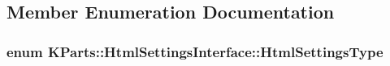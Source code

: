 \subsection{\-Member \-Enumeration \-Documentation}
\hypertarget{classKParts_1_1HtmlSettingsInterface_a62e44360376f423604c5c838ec0e312f}{
\subsubsection[{\-Html\-Settings\-Type}]{\setlength{\rightskip}{0pt plus 5cm}enum {\bf \-K\-Parts\-::\-Html\-Settings\-Interface\-::\-Html\-Settings\-Type}}}\label{classKParts_1_1HtmlSettingsInterface_a62e44360376f423604c5c838ec0e312f}
